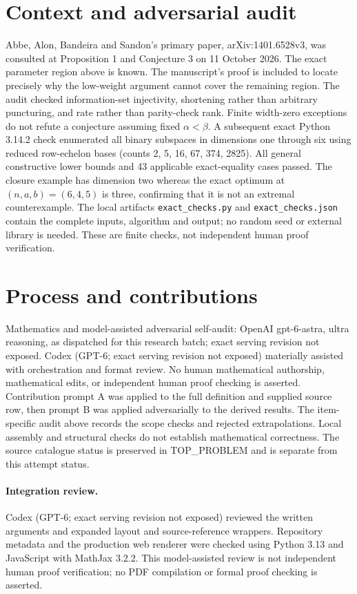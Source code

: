 \documentclass[11pt]{article}
\begin{document}
\section{Context and adversarial audit}
Abbe, Alon, Bandeira and Sandon's primary paper, arXiv:1401.6528v3, was
consulted at Proposition 1 and Conjecture 3 on 11 October 2026. The exact
parameter region above is known. The manuscript's proof is included to
locate precisely why the low-weight argument cannot cover the remaining
region. The audit checked information-set injectivity, shortening rather
than arbitrary puncturing, and rate rather than parity-check rank. Finite
width-zero exceptions do not refute a conjecture assuming fixed
$\alpha<\beta$. A subsequent exact Python 3.14.2 check enumerated all binary
subspaces in dimensions one through six using reduced row-echelon bases
(counts 2, 5, 16, 67, 374, 2825). All general constructive lower bounds and
43 applicable exact-equality cases passed. The closure example has dimension
two whereas the exact optimum at $(n,a,b)=(6,4,5)$ is three, confirming that
it is not an extremal counterexample. The local artifacts
\texttt{exact\_checks.py} and \texttt{exact\_checks.json} contain the complete
inputs, algorithm and output; no random seed or external library is needed.
These are finite checks, not independent human proof verification.

\section{Process and contributions}
Mathematics and model-assisted adversarial self-audit: OpenAI gpt-6-astra, ultra reasoning, as dispatched for this research batch; exact serving revision not exposed. Codex (GPT-6; exact serving revision not exposed) materially assisted with orchestration and format review. No human mathematical authorship, mathematical edits, or independent human proof checking is asserted.
Contribution prompt A was applied to the full definition and supplied source row, then prompt B was applied adversarially to the derived results. The item-specific audit above records the scope checks and rejected extrapolations. Local assembly and structural checks do not establish mathematical correctness. The source catalogue status is preserved in TOP\_PROBLEM and is separate from this attempt status.
\paragraph{Integration review.} Codex (GPT-6; exact serving revision not exposed) reviewed the written arguments and expanded layout and source-reference wrappers. Repository metadata and the production web renderer were checked using Python 3.13 and JavaScript with MathJax 3.2.2. This model-assisted review is not independent human proof verification; no PDF compilation or formal proof checking is asserted.
\end{document}
